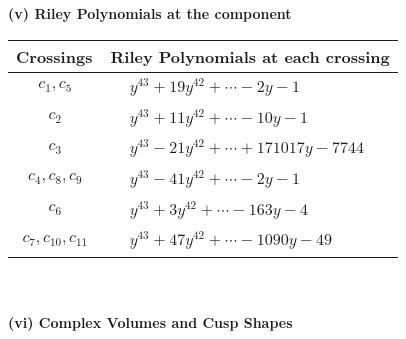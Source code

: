 \documentclass[1p]{elsarticle_modified}
\theoremstyle{definition}
\begin{document}
\newpage\renewcommand{\arraystretch}{1}
\flushleft \textbf{(v) Riley Polynomials at the component}\newline \\
\begin{tabular}{m{50pt}|m{274pt}}
Crossings & \hspace{64pt}Riley Polynomials at each crossing \\
\hline $$\begin{aligned}c_{1},c_{5}\end{aligned}$$&$\begin{aligned}
&y^{43}+19 y^{42}+\cdots-2 y-1
\end{aligned}$\\
\hline $$\begin{aligned}c_{2}\end{aligned}$$&$\begin{aligned}
&y^{43}+11 y^{42}+\cdots-10 y-1
\end{aligned}$\\
\hline $$\begin{aligned}c_{3}\end{aligned}$$&$\begin{aligned}
&y^{43}-21 y^{42}+\cdots+171017 y-7744
\end{aligned}$\\
\hline $$\begin{aligned}c_{4},c_{8},c_{9}\end{aligned}$$&$\begin{aligned}
&y^{43}-41 y^{42}+\cdots-2 y-1
\end{aligned}$\\
\hline $$\begin{aligned}c_{6}\end{aligned}$$&$\begin{aligned}
&y^{43}+3 y^{42}+\cdots-163 y-4
\end{aligned}$\\
\hline $$\begin{aligned}c_{7},c_{10},c_{11}\end{aligned}$$&$\begin{aligned}
&y^{43}+47 y^{42}+\cdots-1090 y-49
\end{aligned}$\\
\hline
\end{tabular}\\~\\
\newpage\flushleft \textbf{(vi) Complex Volumes and Cusp Shapes}
\end{document}
